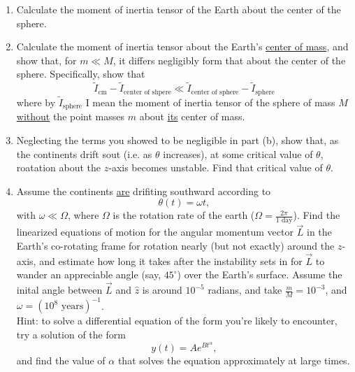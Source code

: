 \documentclass[12pt]{article}
\begin{document}
\begin{enumerate}[label=(\alph*)]
    \item Calculate the moment of inertia tensor of the Earth about the center of the sphere.
    \item Calculate the moment of inertia tensor about the Earth's \underline{center of mass}, and show that, for $m \ll M$, it differs negligibly form that about the center of the sphere. Specifically, show that
    \begin{equation}
        \tilde{I}_\text{cm} - \tilde{I}_\text{center of shpere} \ll \tilde{I}_\text{center of sphere} - \tilde{I}_\text{sphere} \tag{3.1}\label{eq:3.1}
    \end{equation}
    where by $\tilde{I}_\text{sphere}$ I mean the moment of inertia tensor of the sphere of mass $M$ \underline{without} the point masses $m$ about \underline{its} center of mass.
    \item Neglecting the terms you showed to be negligible in part (b), show that, as the continents drift sout (i.e. as $\theta$ increases), at some critical value of $\theta$, roatation about the $z$-axis becomes unstable. Find that critical value of $\theta$.
    \item Assume the continents \underline{are} drifiting southward according to
    \begin{equation}
        \theta(t) = \omega t, \tag{3.2}\label{eq:3.2}
    \end{equation}
    with $\omega \ll \Omega$, where $\Omega$ is the rotation rate of the earth ($\Omega = \frac{2\pi}{1 \text{ day}}$). Find the linearized equations of motion for the angular momentum vector $\vec{L}$ in the Earth's co-rotating frame for rotation nearly (but not exactly) around the $z$-axis, and estimate how long it takes after the instability sets in for $\vec{L}$ to wander an appreciable angle (say, $45^{\circ}$) over the Earth's surface. Assume the inital angle between $\vec{L}$ and $\hat{z}$ is around $10^{-5}$ radians, and take $\frac{m}{M}=10^{-3}$, and $\omega=(10^8 \text{ years})^{-1}$. \\ Hint: to solve a differential equation of the form you're likely to encounter, try a solution of the form \[ y(t) = Ae^{Bt^\alpha}, \] and find the value of $\alpha$ that solves the equation approximately at large times.
\end{enumerate}
\end{document}
